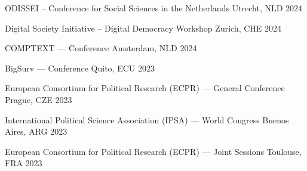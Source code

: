 \begin{cvhonors}
\cvconf
{ODISSEI -- Conference for Social Sciences in the Netherlands} 
{Utrecht, NLD}
{2024}
\end{cvhonors}

\begin{cvhonors}
\cvconf
{Digital Society Initiative -- Digital Democracy Workshop} 
{Zurich, CHE}
{2024}
\end{cvhonors}



\begin{cvhonors}
\cvconf
{COMPTEXT --- Conference} 
{Amsterdam, NLD}
{2024}
\end{cvhonors}

\begin{cvhonors}
\cvconf
{BigSurv --- Conference} 
{Quito, ECU}
{2023}
\end{cvhonors}

\begin{cvhonors}
\cvconf
{European Consortium for Political Research (ECPR) --- General Conference} 
{Prague, CZE}
{2023}
\end{cvhonors}

\begin{cvhonors}
\cvconf
{International Political Science Association (IPSA) --- World Congress} 
{Buenos Aires, ARG}
{2023}
\end{cvhonors}



\begin{cvhonors}
\cvconf
{European Consortium for Political Research (ECPR) --- Joint Sessions} 
{Toulouse, FRA}
{2023}
\end{cvhonors}

